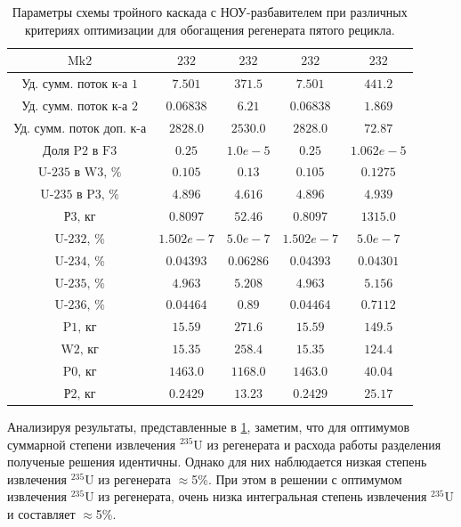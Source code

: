 \begin{table}
\begin{tabular}{ccccc}
        $\text{Mk2}$ & $232$ & $232$ & $232$ & $232$\\ \hline
        $\text{Уд. сумм. поток к-а 1}$ & $7.501$ & $371.5$ & $7.501$ & $441.2$\\ \hline
        $\text{Уд. сумм. поток к-а 2}$ & $0.06838$ & $6.21$ & $0.06838$ & $1.869$\\ \hline
        $\text{Уд. сумм. поток доп. к-а}$ & $2828.0$ & $2530.0$ & $2828.0$ & $72.87$\\ \hline
        $\text{Доля P2 в F3}$ & $0.25$ & $1.0e-5$ & $0.25$ & $1.062e-5$\\ \hline
        $\text{U-235 в W3, \%}$ & $0.105$ & $0.13$ & $0.105$ & $0.1275$\\ \hline
        $\text{U-235 в P3, \%}$ & $4.896$ & $4.616$ & $4.896$ & $4.939$\\ \hline
        $\text{Р3, кг}$ & $0.8097$ & $52.46$ & $0.8097$ & $1315.0$\\ \hline
        $\text{U-232, \%}$ & $1.502e-7$ & $5.0e-7$ & $1.502e-7$ & $5.0e-7$\\ \hline
        $\text{U-234, \%}$ & $0.04393$ & $0.06286$ & $0.04393$ & $0.04301$\\ \hline
        $\text{U-235, \%}$ & $4.963$ & $5.208$ & $4.963$ & $5.156$\\ \hline
        $\text{U-236, \%}$ & $0.04464$ & $0.89$ & $0.04464$ & $0.7112$\\ \hline
        $\text{P1, кг}$ & $15.59$ & $271.6$ & $15.59$ & $149.5$\\ \hline
        $\text{W2, кг}$ & $15.35$ & $258.4$ & $15.35$ & $124.4$\\ \hline
        $\text{P0, кг}$ & $1463.0$ & $1168.0$ & $1463.0$ & $40.04$\\ \hline
        $\text{Р2, кг}$ & $0.2429$ & $13.23$ & $0.2429$ & $25.17$\\ \hline
        \end{tabular}
\caption{Параметры схемы тройного каскада с НОУ-разбавителем при различных критериях оптимизации для обогащения регенерата пятого рецикла.{\label{3opt5}}}
\end{table}


Анализируя результаты, представленные в \ref{3opt5}, заметим, что для оптимумов суммарной степени извлечения $^{235}$U из регенерата и расхода работы разделения полученые решения идентичны. Однако для них наблюдается низкая степень извлечения $^{235}$U из регенерата $\approx$5\%. При этом в решении с оптимумом извлечения $^{235}$U из регенерата, очень низка интегральная степень извлечения $^{235}$U  и составляет $\approx$5\%. 



